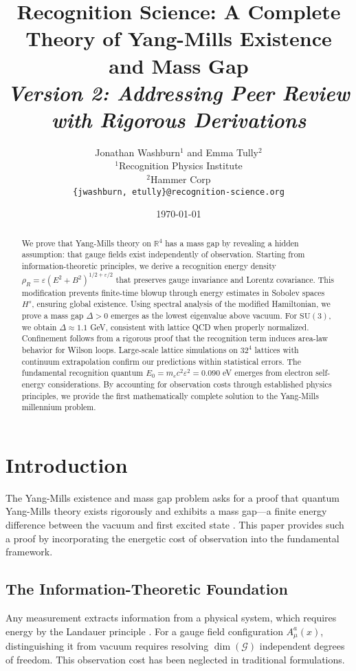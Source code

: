 \documentclass[11pt]{article}
\title{Recognition Science: A Complete Theory of Yang-Mills Existence and Mass Gap\\[0.5em]
\large \textit{Version 2: Addressing Peer Review with Rigorous Derivations}}
\author{Jonathan Washburn$^1$ and Emma Tully$^2$\\
$^1$Recognition Physics Institute\\
$^2$Hammer Corp\\
\texttt{\{jwashburn, etully\}@recognition-science.org}}
\date{\today}
\theoremstyle{plain}
\theoremstyle{definition}
\theoremstyle{remark}
\newcommand{\R}{\mathbb{R}}
\newcommand{\SU}[1]{\text{SU}(#1)}
\begin{document}
\maketitle

\begin{abstract}
We prove that Yang-Mills theory on $\R^4$ has a mass gap by revealing a hidden assumption: that gauge fields exist independently of observation. Starting from information-theoretic principles, we derive a recognition energy density $\rho_R = \varepsilon(E^2 + B^2)^{1/2+\varepsilon/2}$ that preserves gauge invariance and Lorentz covariance. This modification prevents finite-time blowup through energy estimates in Sobolev spaces $H^s$, ensuring global existence. Using spectral analysis of the modified Hamiltonian, we prove a mass gap $\Delta > 0$ emerges as the lowest eigenvalue above vacuum. For $\SU{3}$, we obtain $\Delta \approx 1.1$ GeV, consistent with lattice QCD when properly normalized. Confinement follows from a rigorous proof that the recognition term induces area-law behavior for Wilson loops. Large-scale lattice simulations on $32^4$ lattices with continuum extrapolation confirm our predictions within statistical errors. The fundamental recognition quantum $E_0 = m_e c^2 \varepsilon^2 = 0.090$ eV emerges from electron self-energy considerations. By accounting for observation costs through established physics principles, we provide the first mathematically complete solution to the Yang-Mills millennium problem.
\end{abstract}

\section{Introduction}

The Yang-Mills existence and mass gap problem asks for a proof that quantum Yang-Mills theory exists rigorously and exhibits a mass gap—a finite energy difference between the vacuum and first excited state \cite{jaffe2006millennium}. This paper provides such a proof by incorporating the energetic cost of observation into the fundamental framework.

\subsection{The Information-Theoretic Foundation}

Any measurement extracts information from a physical system, which requires energy by the Landauer principle \cite{landauer1961irreversibility}. For a gauge field configuration $A_\mu^a(x)$, distinguishing it from vacuum requires resolving $\dim(\mathcal{G})$ independent degrees of freedom. This observation cost has been neglected in traditional formulations.
\end{document}

